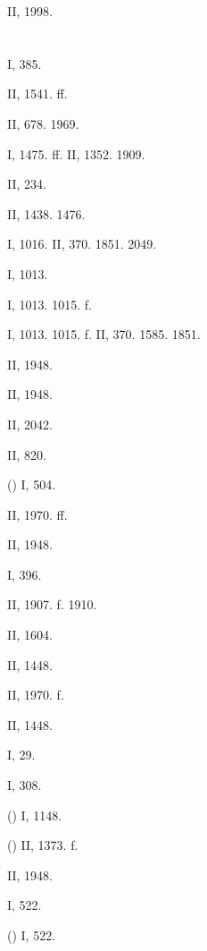  II, 1998.

\section{}

 I, 385.

 II, 1541. ff.

 II, 678. 1969.

 I, 1475. ff. II, 1352. 1909.

 II, 234.

 II, 1438. 1476.

 I, 1016. II, 370. 1851. 2049.

 I, 1013.

 I, 1013. 1015. f.

 I, 1013. 1015. f. II, 370. 1585. 1851.

 II, 1948.

 II, 1948.

 II, 2042.

 II, 820.

 () I, 504.

 II, 1970. ff.

 II, 1948.

 I, 396.

 II, 1907. f. 1910.

 II, 1604.

 II, 1448.

 II, 1970. f.

 II, 1448.

 I, 29.

 I, 308.

 () I, 1148.

 () II, 1373. f.

 II, 1948.

 I, 522.

 () I, 522.

